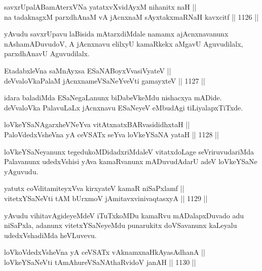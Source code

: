 \begin{shl}
savxrUpalABamAterxVNa yatatxvXvidAyxM nihanitx naH || \\
na tadaknagxM parxdhAnaM vA jAcnxnaM sAyxtakxmaRNaH kavxcitf \hfill || 1126 ||  
\end{shl}

\begin{artha}
yAvudu savxrUpavu laBisida mAtarxdiMdale namamx ajAcnxnavanunx nAshamADuvudoV, A jAcnxnavu elilxyU kamaRkekx aMgavU Aguvudilalx, parxdhAnavU Aguvudilalx.
\end{artha}

\begin{shl}
EtadabxleVna saMnAyxsa ESaNABoyxV\s vasiVyateV ||  \\
deVvaloVkaPalaM jAcnxnameVSaNeYveVti gamayxteV \hfill || 1127 ||  
\end{shl}

\begin{artha}
idara baladiMda ESaNegaLanunx biDabeVkeMdu nishacxya mADide. deVvaloVka PalavuLaLx jAcnxnavu ESaNeyeV eMbudAgi tiLiyalapxTiTxde.
\end{artha}

\begin{shl}
loVkeYSaNAgarxheVNeYva vitAtxnatxBARvasididhxtaH || \\
PaloVdedxVsheVna yA ceVSATx seYva loVkeYSaNA yataH \hfill || 1128 ||  
\end{shl}

\begin{artha}
loVkeYSaNeyanunx tegedukoMDidadxriMdaleV vitatxdoLage seVriruvudariMda Palavanunx udedxVshisi yAva kamaRvanunx mADuvudAdarU adeV loVkeYSaNe yAguvudu.
\end{artha}

\begin{shl}
yatutx coVditamiteyxVva kirxyateV kamaR niSaPxlamf || \\
vitetxYSaNeVti tAM bUrxmoV jAmitavxvinivaqtasxyA \hfill || 1129 ||  
\end{shl}

\begin{artha}
yAvudu vihitavAgideyeMdeV iTuTxkoMDu kamaRvu mADalapxDuvado adu niSaPxla, adanunx vitetxYSaNeyeMdu punarukitx doVSavanunx kaLeyalu udedxVshadiMda heVLuvevu.
\end{artha}


\begin{shl}
loVkoVdedxVsheVna yA ceVSATx vAknamxnaHkAyasAdhanA || \\
loVkeYSaNeVti tAmAhureVSaNAthaRvidoV janAH \hfill || 1130 ||  
\end{shl}

